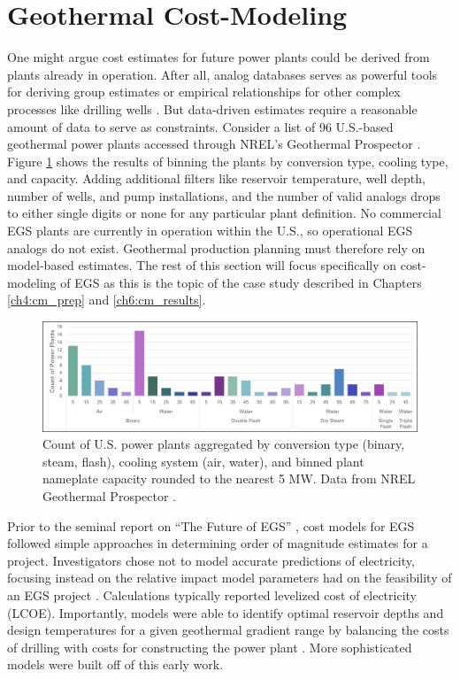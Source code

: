 \section{Geothermal Cost-Modeling}\label{ch2:cost_models}
One might argue cost estimates for future power plants could be derived from plants already in operation. After all, analog databases serves as powerful tools for deriving group estimates or empirical relationships for other complex processes like drilling wells \citep{lukawski_cost_2014, tester_future_2006}. But data-driven estimates require a reasonable amount of data to serve as constraints. Consider a list of 96 U.S.-based geothermal power plants accessed through NREL’s Geothermal Prospector \citep{nrel_geothermal_2021}. Figure \ref{fig:nrel_us_pplants} shows the results of binning the plants by conversion type, cooling type, and capacity. Adding additional filters like reservoir temperature, well depth, number of wells, and pump installations, and the number of valid analogs drops to either single digits or none for any particular plant definition. No commercial EGS plants are currently in operation within the U.S., so operational EGS analogs do not exist. Geothermal production planning must therefore rely on model-based estimates. The rest of this section will focus specifically on cost-modeling of EGS as this is the topic of the case study described in Chapters \ref{ch4:cm_prep} and \ref{ch6:cm_results}.

\begin{figure}
\centering
\includegraphics[width=.95\textwidth]{templates/images/Figure-NREL_US_PowerPlants.png}
\caption[Power plants in the United States]{Count of U.S. power plants aggregated by conversion type (binary, steam, flash), cooling system (air, water), and binned plant nameplate capacity rounded to the nearest 5 MW. Data from NREL Geothermal Prospector \protect\citep{nrel_geothermal_2021}.}
\label{fig:nrel_us_pplants}
\end{figure}

Prior to the seminal report on “The Future of EGS” \citep{tester_future_2006}, cost models for EGS followed simple approaches in determining order of magnitude estimates for a project. Investigators chose not to model accurate predictions of electricity, focusing instead on the relative impact model parameters had on the feasibility of an EGS project \citep{augustine_hydrothermal_2009}. Calculations typically reported levelized cost of electricity (LCOE). Importantly, models were able to identify optimal reservoir depths and design temperatures for a given geothermal gradient range by balancing the costs of drilling with costs for constructing the power plant \citep{tester_economic_1990}. More sophisticated models were built off of this early work.

